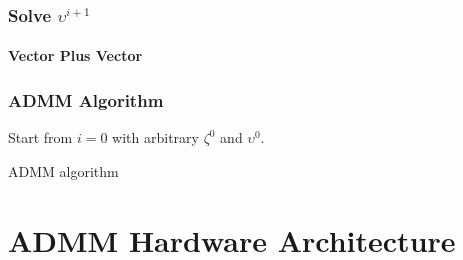 \documentclass{beamer}
\begin{document}
\begin{frame}
\frametitle{Solve $\upsilon^{i+1}$}
\framesubtitle{Vector Plus Vector}

\end{frame}

\begin{frame}[fragile]
\frametitle{ADMM Algorithm}
\begin{algorithm}[H]
Start from $i=0$ with arbitrary $\zeta^0$ and $\upsilon^0$.
\caption{ADMM algorithm}\label{alg:ADMM}
\end{algorithm}
\end{frame}



\section{ADMM Hardware Architecture}
\end{document}

